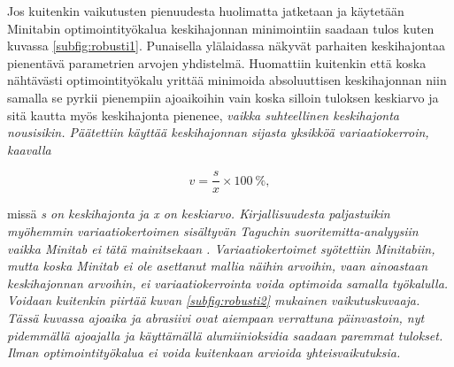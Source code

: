 \documentclass[12pt,a4paper,finnish]{tutthesis}
\begin{document}
Jos kuitenkin vaikutusten pienuudesta huolimatta
jatketaan ja käytetään Minitabin optimointityökalua keskihajonnan minimointiin
saadaan tulos kuten kuvassa \ref{subfig:robusti1}.
Punaisella ylälaidassa näkyvät parhaiten keskihajontaa pienentävä parametrien arvojen yhdistelmä. Huomattiin kuitenkin että koska nähtävästi
optimointityökalu yrittää minimoida absoluuttisen keskihajonnan niin samalla se
pyrkii pienempiin ajoaikoihin vain koska silloin tuloksen keskiarvo ja sitä kautta myös keskihajonta pienenee, \em vaikka suhteellinen keskihajonta nousisikin. \em Päätettiin käyttää keskihajonnan sijasta yksikköä \em variaatiokerroin, \em kaavalla

\begin{equation}
  \label{eq:varkerroin}
 v = \frac{s}{x} \times 100\> \%,
\end{equation}

missä \em s \em on keskihajonta ja \em x \em on keskiarvo.
Kirjallisuudesta paljastuikin myöhemmin variaatiokertoimen sisältyvän Taguchin suoritemitta-analyysiin vaikka Minitab ei tätä mainitsekaan \parencite{Steinberg1998,Kawamura2010,Wu2009}.
Variaatiokertoimet syötettiin Minitabiin, mutta koska Minitab ei ole asettanut mallia näihin arvoihin, vaan ainoastaan keskihajonnan arvoihin, ei variaatiokerrointa voida optimoida samalla työkalulla. Voidaan kuitenkin piirtää kuvan \ref{subfig:robusti2} mukainen vaikutuskuvaaja.
Tässä kuvassa ajoaika ja abrasiivi ovat aiempaan verrattuna päinvastoin, nyt pidemmällä ajoajalla ja käyttämällä alumiinioksidia saadaan paremmat tulokset. Ilman optimointityökalua ei voida kuitenkaan arvioida yhteisvaikutuksia.
\end{document}
